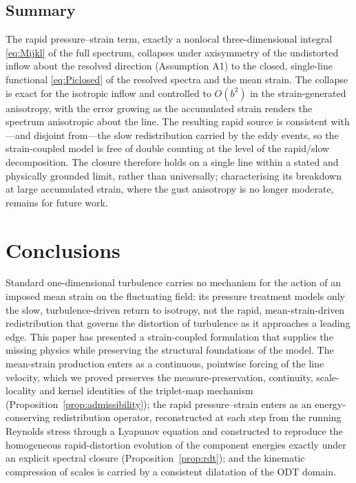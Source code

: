 \documentclass[lineno]{JFM-FLM_Au}
\begin{document}
\subsection{Summary}\label{sec:gate-summary}

The rapid pressure--strain term, exactly a nonlocal three-dimensional integral
\eqref{eq:Mijkl} of the full spectrum, collapses under axisymmetry of the
undistorted inflow about the resolved direction (Assumption A1) to the closed,
single-line functional \eqref{eq:Piclosed} of the resolved spectra and the
mean strain. The collapse is exact for the isotropic inflow and controlled to
$O(b^2)$ in the strain-generated anisotropy, with the error growing as the
accumulated strain renders the spectrum anisotropic about the line. The
resulting rapid source is consistent with---and disjoint from---the slow
redistribution carried by the eddy events, so the strain-coupled model is free
of double counting at the level of the rapid/slow decomposition. The closure
therefore holds on a single line within a stated and physically grounded
limit, rather than universally; characterising its breakdown at large accumulated strain, where the gust anisotropy is no longer moderate, remains for future work.

\section{Conclusions}\label{sec:conclusions}
Standard one-dimensional turbulence carries no mechanism for the action of an
imposed mean strain on the fluctuating field: its pressure treatment models
only the slow, turbulence-driven return to isotropy, not the rapid,
mean-strain-driven redistribution that governs the distortion of turbulence
as it approaches a leading edge. This paper has presented a strain-coupled
formulation that supplies the missing physics while preserving the structural
foundations of the model. The mean-strain production enters as a continuous,
pointwise forcing of the line velocity, which we proved preserves the
measure-preservation, continuity, scale-locality and kernel identities of the
triplet-map mechanism (Proposition~\ref{prop:admissibility}); the rapid
pressure--strain enters as an energy-conserving redistribution operator,
reconstructed at each step from the running Reynolds stress through a Lyapunov
equation and constructed to reproduce the homogeneous rapid-distortion
evolution of the component energies exactly under an explicit spectral closure
(Proposition~\ref{prop:rdt}); and the kinematic compression of scales is
carried by a consistent dilatation of the ODT domain.
\end{document}
